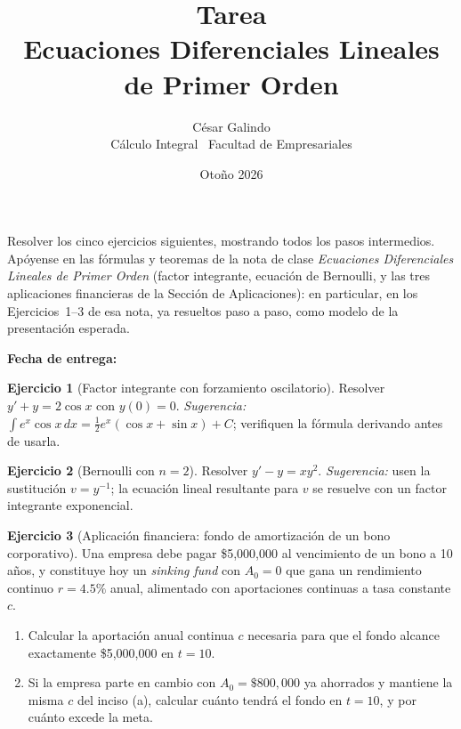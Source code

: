 \documentclass[11pt,a4paper,oneside]{article}
\title{\vspace{-1.5cm}\textbf{\Large Tarea}\\[2pt]
\large Ecuaciones Diferenciales Lineales de Primer Orden}
\author{César Galindo\\ \small Cálculo Integral \textperiodcentered\ Facultad de Empresariales}
\date{\small Otoño 2026}
\theoremstyle{definition}
\newtheorem{tarea}{Ejercicio}
\begin{document}
\maketitle
\vspace{-0.8cm}

\begin{ideaBox}
Resolver los cinco ejercicios siguientes, mostrando todos los pasos
intermedios. Apóyense en las fórmulas y teoremas de la nota de clase
\emph{Ecuaciones Diferenciales Lineales de Primer Orden} (factor
integrante, ecuación de Bernoulli, y las tres aplicaciones financieras
de la Sección de Aplicaciones): en particular, en los Ejercicios~1--3 de
esa nota, ya resueltos paso a paso, como modelo de la presentación
esperada.

\smallskip
\textbf{Fecha de entrega:} \underline{\hspace{4.5cm}}
\end{ideaBox}

\begin{tarea}[Factor integrante con forzamiento oscilatorio]
Resolver $y' + y = 2\cos x$ con $y(0)=0$.
\emph{Sugerencia:} $\displaystyle\int e^x\cos x\,dx =
\tfrac12 e^x(\cos x+\sin x)+C$; verifiquen la fórmula derivando antes de
usarla.
\end{tarea}

\begin{tarea}[Bernoulli con $n=2$]
Resolver $y' - y = xy^2$.
\emph{Sugerencia:} usen la sustitución $v=y^{-1}$; la ecuación lineal
resultante para $v$ se resuelve con un factor integrante exponencial.
\end{tarea}

\begin{tarea}[Aplicación financiera: fondo de amortización de un bono corporativo]
Una empresa debe pagar \$5{,}000{,}000 al vencimiento de un bono a 10
años, y constituye hoy un \emph{sinking fund} con $A_0=0$ que gana un
rendimiento continuo $r=4.5\%$ anual, alimentado con aportaciones
continuas a tasa constante $c$.
\begin{enumerate}[label=(\alph*)]
  \item Calcular la aportación anual continua $c$ necesaria para que el
  fondo alcance exactamente \$5{,}000{,}000 en $t=10$.
  \item Si la empresa parte en cambio con $A_0=\$800{,}000$ ya ahorrados
  y mantiene la misma $c$ del inciso (a), calcular cuánto tendrá el
  fondo en $t=10$, y por cuánto excede la meta.
\end{enumerate}
\end{tarea}
\end{document}
